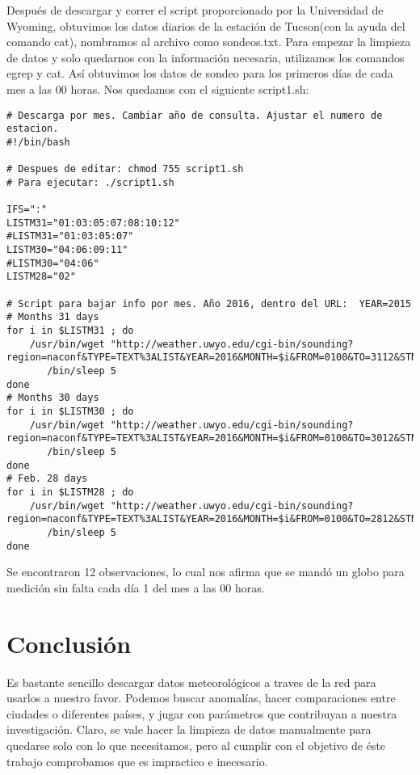 \documentclass[12pt]{article}
\begin{document}
\noindent Despu\'es de descargar y correr el script proporcionado por la Universidad de Wyoming, obtuvimos los datos diarios de la estaci\'on de Tucson(con la ayuda del comando cat), nombramos al archivo como sondeos.txt. Para empezar la limpieza de datos y solo quedarnos con la informaci\'on necesaria, utilizamos los comandos egrep y cat. As\'i obtuvimos los datos de sondeo para los primeros d\'ias de cada mes a las 00 horas. Nos quedamos con el siguiente script1.sh:
\begin{tiny}
\begin{verbatim}
# Descarga por mes. Cambiar año de consulta. Ajustar el numero de estacion.
#!/bin/bash
 
# Despues de editar: chmod 755 script1.sh
# Para ejecutar: ./script1.sh
 
IFS=":"
LISTM31="01:03:05:07:08:10:12"
#LISTM31="01:03:05:07"
LISTM30="04:06:09:11"
#LISTM30="04:06"
LISTM28="02"
 
# Script para bajar info por mes. Año 2016, dentro del URL:  YEAR=2015
# Months 31 days
for i in $LISTM31 ; do
    /usr/bin/wget "http://weather.uwyo.edu/cgi-bin/sounding?region=naconf&TYPE=TEXT%3ALIST&YEAR=2016&MONTH=$i&FROM=0100&TO=3112&STNM=72274"
       /bin/sleep 5
done
# Months 30 days
for i in $LISTM30 ; do
    /usr/bin/wget "http://weather.uwyo.edu/cgi-bin/sounding?region=naconf&TYPE=TEXT%3ALIST&YEAR=2016&MONTH=$i&FROM=0100&TO=3012&STNM=72274"
       /bin/sleep 5
done
# Feb. 28 days
for i in $LISTM28 ; do
    /usr/bin/wget "http://weather.uwyo.edu/cgi-bin/sounding?region=naconf&TYPE=TEXT%3ALIST&YEAR=2016&MONTH=$i&FROM=0100&TO=2812&STNM=72274"
       /bin/sleep 5
done

\end{verbatim}
\end{tiny}

Se encontraron 12 observaciones, lo cual nos afirma que se mand\'o un globo para medici\'on sin falta cada d\'ia 1 del mes a las 00 horas. 
\section{Conclusi\'on}
\noindent Es bastante sencillo descargar datos meteorol\'ogicos a traves de la red para usarlos a nuestro favor. Podemos buscar anomal\'ias, hacer comparaciones entre ciudades o diferentes pa\'ises, y jugar con par\'ametros que contribuyan a nuestra investigaci\'on. Claro, se vale hacer la limpieza de datos manualmente para quedarse solo con lo que necesitamos, pero al cumplir con el objetivo de \'este trabajo comprobamos que es impractico e inecesario. 
\end{document}
